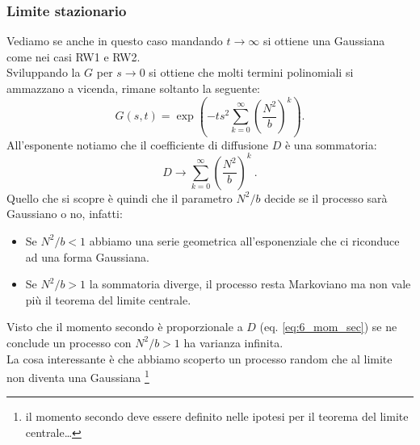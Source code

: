 \subsubsection{Limite stazionario}%
\label{subsub:Limite stazionario}
Vediamo se anche in questo caso mandando $t\to \infty$ si ottiene una Gaussiana come nei casi RW1 e RW2.\\
Sviluppando la $G$ per $s\to 0$ si ottiene che molti termini polinomiali si ammazzano a vicenda, rimane soltanto la seguente:
\[
    G(s,t) = \exp\left(-ts^2 \sum_{k=0}^{\infty} \left(\frac{N^2}{b}\right)^k\right)
.\] 
All'esponente notiamo che il coefficiente di diffusione $D$ è una sommatoria:
\[
    D \to \sum_{k=0}^{\infty} \left(\frac{N^2}{b}\right)^k\
.\] 
Quello che si scopre è quindi che il parametro $N^2 /b$ decide se il processo sarà Gaussiano o no, infatti:
\begin{redbox}{}
\begin{itemize}
    \item Se $N^2 /b< 1$ abbiamo una serie geometrica all'esponenziale che ci riconduce ad una forma Gaussiana.
    \item Se $N^2 /b > 1$ la sommatoria diverge, il processo resta Markoviano ma non vale più il teorema del limite centrale.
\end{itemize}
\end{redbox}
\noindent
Visto che il momento secondo è proporzionale a $D$ (eq. \ref{eq:6_mom_sec}) se ne conclude un processo con $N^2 /b > 1$ ha varianza infinita.\\
La cosa interessante è che abbiamo scoperto un processo random che al limite non diventa una Gaussiana \footnote{il momento secondo deve essere definito nelle ipotesi per il teorema del limite centrale\ldots}

